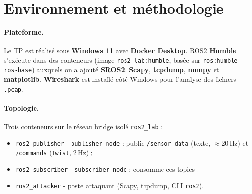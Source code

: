 \documentclass[11pt,a4paper]{article}
\newcommand{\cmd}[1]{\texttt{\small #1}}
\begin{document}
\tableofcontents
\vspace{6mm}

\newpage
\section{Environnement et méthodologie}

\paragraph{Plateforme.} Le TP est réalisé sous \textbf{Windows 11} avec
\textbf{Docker Desktop}. ROS2 \textbf{Humble} s'exécute dans des conteneurs
(image \cmd{ros2-lab:humble}, basée sur \cmd{ros:humble-ros-base}) auxquels on a
ajouté \textbf{SROS2}, \textbf{Scapy}, \textbf{tcpdump}, \textbf{numpy} et
\textbf{matplotlib}. \textbf{Wireshark} est installé côté Windows pour l'analyse
des fichiers \cmd{.pcap}.

\paragraph{Topologie.} Trois conteneurs sur le réseau bridge isolé \cmd{ros2\_lab} :
\begin{itemize}[nosep]
  \item \cmd{ros2\_publisher} - \cmd{publisher\_node} : publie \cmd{/sensor\_data}
        (texte, $\approx$20\,Hz) et \cmd{/commands} (\cmd{Twist}, 2\,Hz) ;
  \item \cmd{ros2\_subscriber} - \cmd{subscriber\_node} : consomme ces topics ;
  \item \cmd{ros2\_attacker} - poste attaquant (Scapy, tcpdump, CLI \cmd{ros2}).
\end{itemize}
\end{document}
